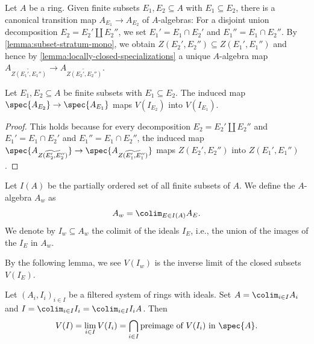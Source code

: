 Let $A$ be a ring. Given finite subsets $E_1, E_2 \subseteq A$ with $E_1 \subseteq E_2$, there is a
canonical transition map $A_{E_1} \to A_{E_2}$ of $A$-algebras: For
a disjoint union decomposition $E_2 = E_2' \coprod E_2''$, we set
$E_1' = E_1 \cap E_2'$ and $E_1'' = E_1 \cap E_2''$. By \ref{lemma:subset-stratum-mono},
we obtain $Z(E_2', E_2'') \subseteq Z(E_1', E_1'')$ and hence
by \ref{lemma:locally-closed-specializations} a unique $A$-algebra map
$A_{\widetilde{Z(E_1', E_1'')}} \to A_{\widetilde{Z(E_2', E_2'')}}$.

\begin{lemma}
    Let $E_1, E_2 \subseteq A$ be finite subsets with $E_1 \subseteq E_2$.
    The induced map $\spec{A_{E_2}} \to \spec{A_{E_1}}$ maps
    $V(I_{E_2})$ into $V(I_{E_1})$.
    \label{lemma:finite-stratification-map-closed}
    \leanok
\end{lemma}

\begin{proof}
    \leanok
    This holds because for every decomposition $E_2 = E_2' \coprod E_2''$
    and $E_1' = E_1 \cap E_2'$ and $E_1'' = E_1 \cap E_2''$, the induced map
    $\spec{A_{\widetilde{Z(E_2', E_2'')}}} \to \spec{A_{\widetilde{Z(E_1', E_1'')}}}$
    maps $Z(E_2', E_2'')$ into $Z(E_1', E_1'')$.
\end{proof}

\begin{definition}
    Let $I(A)$ be the partially ordered set of all finite subsets of $A$. We define the
    $A$-algebra $A_{w}$ as
    \[
    A_w = \colim_{E \in I(A)} A_E
    .\]
    We denote by $I_w \subseteq A_w$ the colimit of the ideals $I_E$, i.e.,
    the union of the images of the $I_E$ in $A_w$.%
    \label{def:w-localization}
    \leanok
\end{definition}

By the following lemma, we see $V(I_w)$ is the inverse limit of the closed subsets $V(I_E)$.
\begin{lemma}
  \label{thm:colim-ideal-lim-zero-locus}
    Let $(A_i, I_i)_{i \in I}$ be a filtered system of
    rings with ideals. Set $A = \colim_{i \in I} A_i$ and
    $I = \colim_{i \in I} I_i = \colim_{i \in I} I_i A$. Then
    \[
    V(I) = \lim_{i \in I} V(I_i) = \bigcap_{i \in I} \text{preimage of } V(I_i) \text{ in } \spec{A}
    .\]
  \leanok
\end{lemma}


